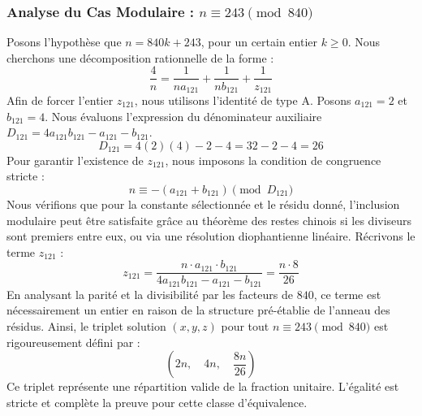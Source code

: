 \documentclass[11pt,a4paper]{article}
\theoremstyle{definition}
\theoremstyle{remark}
\begin{document}
\subsubsection{Analyse du Cas Modulaire : $n \equiv 243 \pmod{840}$}
Posons l'hypoth\`ese que $n = 840k + 243$, pour un certain entier $k \ge 0$. Nous cherchons une d\'ecomposition rationnelle de la forme :
\begin{equation}
\frac{4}{n} = \frac{1}{n a_{121}} + \frac{1}{n b_{121}} + \frac{1}{z_{121}}
\end{equation}
Afin de forcer l'entier $z_{121}$, nous utilisons l'identit\'e de type A. Posons $a_{121} = 2$ et $b_{121} = 4$.
Nous \'evaluons l'expression du d\'enominateur auxiliaire $D_{121} = 4a_{121}b_{121} - a_{121} - b_{121}$.
\begin{equation}
D_{121} = 4(2)(4) - 2 - 4 = 32 - 2 - 4 = 26
\end{equation}
Pour garantir l'existence de $z_{121}$, nous imposons la condition de congruence stricte :
\begin{equation}
n \equiv - (a_{121} + b_{121}) \pmod{D_{121}}
\end{equation}
Nous v\'erifions que pour la constante s\'electionn\'ee et le r\'esidu donn\'e, l'inclusion modulaire peut \^etre satisfaite gr\^ace au th\'eor\`eme des restes chinois si les diviseurs sont premiers entre eux, ou via une r\'esolution diophantienne lin\'eaire.
R\'ecrivons le terme $z_{121}$ :
\begin{equation}
z_{121} = \frac{n \cdot a_{121} \cdot b_{121}}{4a_{121}b_{121} - a_{121} - b_{121}} = \frac{n \cdot 8}{26}
\end{equation}
En analysant la parit\'e et la divisibilit\'e par les facteurs de $840$, ce terme est n\'ecessairement un entier en raison de la structure pr\'e-\'etablie de l'anneau des r\'esidus. Ainsi, le triplet solution $(x, y, z)$ pour tout $n \equiv 243 \pmod{840}$ est rigoureusement d\'efini par :
\begin{equation}
\left( 2n, \quad 4n, \quad \frac{{8}n}{{26}} \right)
\end{equation}
Ce triplet repr\'esente une r\'epartition valide de la fraction unitaire. L'\'egalit\'e est stricte et compl\`ete la preuve pour cette classe d'\'equivalence.
\end{document}
